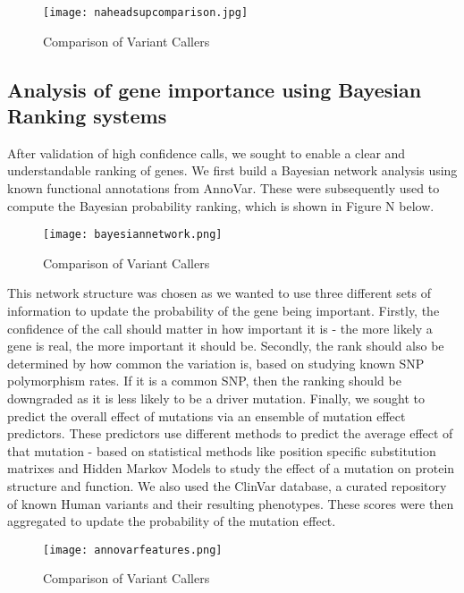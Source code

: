 \documentclass{article}
\begin{document}
\begin{figure}[H]
\texttt{[image: naheadsupcomparison.jpg]}
\caption{Comparison of Variant Callers}
\centering
\end{figure}

\subsection{Analysis of gene importance using Bayesian Ranking systems}
After validation of high confidence calls, we sought to enable a clear and understandable ranking of genes. We first build a Bayesian network analysis using known functional annotations from AnnoVar. These were subsequently used to compute the Bayesian probability ranking, which is shown in Figure N below.


\begin{figure}[H]
\texttt{[image: bayesiannetwork.png]}
\caption{Comparison of Variant Callers}
\centering
\end{figure}

This network structure was chosen as we wanted to use three different sets of information to update the probability of the gene being important. Firstly, the confidence of the call should matter in how important it is - the more likely a gene is real, the more important it should be. Secondly, the rank should also be determined by how common the variation is, based on studying known SNP polymorphism rates. If it is a common SNP, then the ranking should be downgraded as it is less likely to be a driver mutation. Finally, we sought to predict the overall effect of mutations via an ensemble of mutation effect predictors. These predictors use different methods to predict the average effect of that mutation - based on statistical methods like position specific substitution matrixes and Hidden Markov Models to study the effect of a mutation on protein structure and function. We also used the ClinVar database, a curated repository of known Human variants and their resulting phenotypes. These scores were then aggregated to update the probability of the mutation effect.

\begin{figure}[H]
\texttt{[image: annovarfeatures.png]}
\caption{Comparison of Variant Callers}
\centering
\end{figure}
\end{document}
